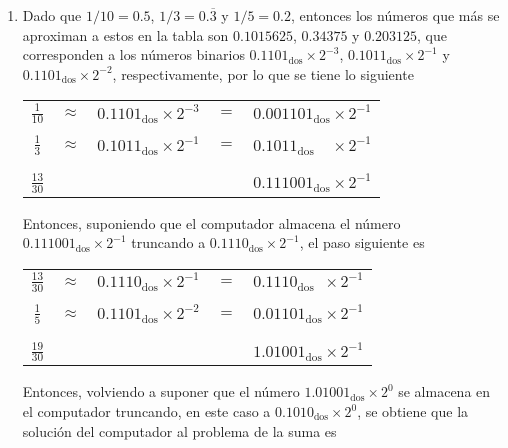 \begin{solucion}
\begin{enumerate}
  \item Dado que $1/10 = 0.5$, $1/3 = 0.\overline{3}$ y $1/5 = 0.2$, entonces los n\'umeros que m\'as se aproximan a estos en la tabla son $0.1015625$, $0.34375$ y $0.203125$, que corresponden a los n\'umeros binarios $0.1101_{\text{dos}}\times 2^{-3}$, $0.1011_{\text{dos}}\times 2^{-1}$ y $0.1101_{\text{dos}}\times 2^{-2}$, respectivamente, por lo que se tiene lo siguiente
  \begin{center}
   \begin{tabular}{ccccc}
    $\frac{1}{10}$ & $\approx$ & $0.1101_{\text{dos}} \times 2^{-3}$ & $=$ & $0.001101_{\text{dos}} \times 2^{-1}$ \\
    \vspace{-0.3cm} 
    \\
    $\frac{1}{3}$ & $\approx$ & $0.1011_{\text{dos}}\times 2^{-1}$ & $=$ & $0.1011_{\text{dos}}\phantom{00} \times 2^{-1}$ \\ 
    \vspace{-0.4cm}
    \\
    \hhline{-~~~-}
    \vspace{-0.4cm}
    \\
    $\frac{13}{30}$ & & & & $0.111001_{\text{dos}} \times 2^{-1}$
   \end{tabular}
  \end{center}
  Entonces, suponiendo que el computador almacena el n\'umero $0.111001_{\text{dos}}\times 2^{-1}$ truncando a $0.1110_{\text{dos}} \times 2^{-1}$, el paso siguiente es
  \begin{center}
   \begin{tabular}{ccccc}
    $\frac{13}{30}$ & $\approx$ & $0.1110_{\text{dos}}\times 2^{-1}$ & $=$ & $0.1110_{\text{dos}}\phantom{0} \times 2^{-1}$ \\ 
    \vspace{-0.3cm} 
    \\
    $\frac{1}{5}$ & $\approx$ & $0.1101_{\text{dos}} \times 2^{-2}$ & $=$ & $0.01101_{\text{dos}} \times 2^{-1}$ \\
    \vspace{-0.4cm}
    \\
    \hhline{-~~~-}
    \vspace{-0.4cm}
    \\
    $\frac{19}{30}$ & & & & $1.01001_{\text{dos}} \times 2^{-1}$
   \end{tabular}
  \end{center}
  Entonces, volviendo a suponer que el n\'umero $1.01001_{\text{dos}} \times 2^{0}$ se almacena en el computador truncando, en este caso a $0.1010_{\text{dos}} \times 2^{0}$, se obtiene que la soluci\'on del computador al problema de la suma es

\end{enumerate}
\end{solucion}
